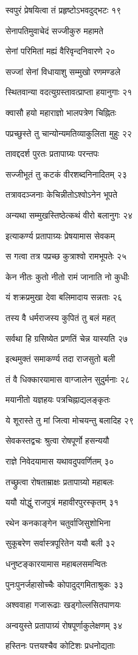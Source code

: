 स्वपुरं प्रेषयित्वा तं प्रहृष्टोऽभवदुद्भटः १९

सेनापतिमुवाचेदं सज्जीकुरु महामते

सेनां परिमितां मह्यं वैरिवृन्दनिवारणे २०

सज्जां सेनां विधायाशु सम्मुखो रणमण्डले

स्थितवान्या वदत्युग्रस्तावत्प्राप्ता हयानुगाः २१

क्वासौ हयो महाराज्ञो भालपत्रेण चिह्नितः

पप्रच्छुस्ते तु चान्योन्यमतिव्याकुलिता मुहुः २२

तावद्ददर्श पुरतः प्रतापाग्र्यः परन्तपः

सज्जीभूतं तु कटकं वीरशब्दनिनादितम् २३

तत्रावदञ्जनाः केचिन्नीतोऽश्वोऽनेन भूपते

अन्यथा सम्मुखस्तिष्ठेत्कथं वीरो बलानुगः २४

इत्याकर्ण्य प्रतापाग्र्यः प्रेषयामास सेवकम्

स गत्वा तत्र पप्रच्छ कुत्राश्वो रामभूपतेः २५

केन नीतः कुतो नीतो रामं जानाति नो कुधीः

यं शक्रप्रमुखा देवा बलिमादाय सन्नताः २६

तस्य वै धर्मराजस्य कुपितं तु बलं महत्

सर्वथा हि ग्रसिष्येत प्रणतिं चेन्न यास्यति २७

इत्थमुक्तं समाकर्ण्य तदा राजसुतो बली

तं वै धिक्कारयामास वाग्जालेन सुदुर्मनाः २८

मयानीतो यज्ञहयः पत्रचिह्नाद्यलङ्कृतः

ये शूरास्ते तु मां जित्वा मोचयन्तु बलादिह २९

सेवकस्तद्वचः श्रुत्वा रोषपूर्णो हसन्ययौ

राज्ञे निवेदयामास यथावदुपवर्णितम् ३०

तच्छ्रुत्वा रोषताम्राक्षः प्रतापाग्र्यो महाबलः

ययौ योद्धुं राजपुत्रं महावीरपुरस्कृतम् ३१

रथेन कनकाङ्गेन चतुर्वाजिसुशोभिना

सुकूबरेण सर्वास्त्रपूरितेन ययौ बली ३२

धनुष्टङ्कारयामास महाबलसमन्वितः

पुनःपुनर्जहासोच्चैः कोपादुद्गमिताश्रुकः ३३

अश्ववाहा गजारूढाः खड्गोल्लसितपाणयः

अन्वयुस्ते प्रतापाग्र्यं रोषपूर्णाकुलेक्षणम् ३४

हस्तिनः पत्तयश्चैव कोटिशः प्रधनोद्यताः


